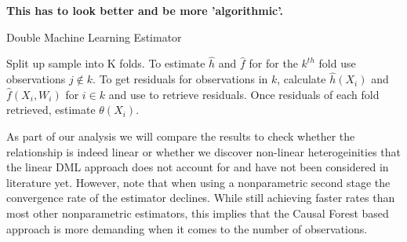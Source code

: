 \textbf{This has to look better and be more 'algorithmic'.}
\begin{algorithm}
    \caption{Double Machine Learning Estimator}
    \begin{algorithmic}[1]
        \State Split up sample into K folds. 
        \State To estimate $\widehat{h}$ and $\widehat{f}$ for for the $k^{th}$ fold use observations $j \notin k$. 
        \State To get residuals for observations in $k$, calculate $\widehat{h}(X_i)$ and $\widehat{f}(X_i, W_i)$ for $i \in k$ and use to retrieve residuals.
        \State Once residuals of each fold retrieved, estimate $\theta(X_i)$.
    \end{algorithmic}
\end{algorithm}
As part of our analysis we will compare the results to check whether the relationship is indeed linear or whether we discover non-linear heterogeinities that the linear DML approach does not account for and have not been considered in literature yet. However, note that when using a nonparametric second stage the convergence rate of the estimator declines. While still achieving faster rates than most other nonparametric estimators, this implies that the Causal Forest based approach is more demanding when it comes to the number of observations. 